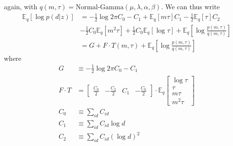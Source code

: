 \documentclass[11pt]{article}
\begin{document}
again, with $q(m, \tau) = \text{Normal-Gamma}(\mu, \lambda, \alpha, \beta)$. We can thus write
\begin{align}
    \mathbb{E}_q[\log p(d|z)] &= -\frac{1}{2}\log 2\pi C_0 - C_1 +
    \mathbb{E}_q[m\tau] C_1 -\frac{1}{2}\mathbb{E}_q[\tau] C_2  \\
    &- \frac{1}{2} C_0 \mathbb{E}_q[m^2\tau] + \frac{1}{2} C_0 \mathbb{E}_q[\log \tau] + \mathbb{E}_q\left[\log \frac{p(m, \tau)}{q(m, \tau)} \right] \\
    &= G + F \cdot T(m, \tau) + \mathbb{E}_q\left[\log \frac{p(m, \tau)}{q(m, \tau)} \right]
\end{align}
where
\begin{align}
    G &\equiv -\frac{1}{2}\log 2\pi C_0 - C_1 \\
    F \cdot T &=
    \begin{bmatrix}
        \frac{C_0}{2} &
        -\frac{C_2}{2} &
        C_1 &
        -\frac{C_0}{2}
    \end{bmatrix} \cdot \mathbb{E}_q
    \begin{bmatrix}
        \log \tau \\
        \tau \\
        m\tau \\
        m^2 \tau
    \end{bmatrix} \\
    C_0 &\equiv \sum_{id} C_{id} \\
    C_1 &\equiv \sum_{id} C_{id} \log d \\
    C_2 &\equiv \sum_{id} C_{id} (\log d)^2
\end{align}
\end{document}
